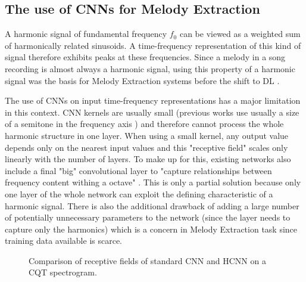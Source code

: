 \documentclass{article}
\begin{document}
\subsection{The use of CNNs for Melody Extraction}

A harmonic signal of fundamental frequency $f_0$ can be viewed as a weighted sum of harmonically related sinusoids. A time-frequency representation of this kind of signal therefore exhibits peaks at these frequencies. Since a melody in a song recording is almost always a harmonic signal, using this property of a harmonic signal was the basis for Melody Extraction systems before the shift to DL \cite{Salamon2014}.

The use of CNNs on input time-frequency representations has a major limitation in this context. CNN kernels are usually small (previous works use usually a size of a semitone in the frequency axis \cite{Bittner2017,DBasaranSEssid2018}) and therefore cannot process the whole harmonic structure in one layer. When using a small kernel, any output value depends only on the nearest input values and this "receptive field" scales only linearly with the number of layers. To make up for this, existing networks also include a final "big" convolutional layer to "capture relationships between frequency content withing a octave" \cite{Bittner2017}. This is only a partial solution because only one layer of the whole network can exploit the defining characteristic of a harmonic signal. There is also the additional drawback of adding a large number of potentially unnecessary parameters to the network (since the layer needs to capture only the harmonics) which is a concern in Melody Extraction task since training data available is scarce.


\begin{figure}
 \centerline{}
 \caption{Comparison of receptive fields of standard CNN and HCNN on a CQT spectrogram.}
 \label{fig:vibrato}
\end{figure}
\end{document}
